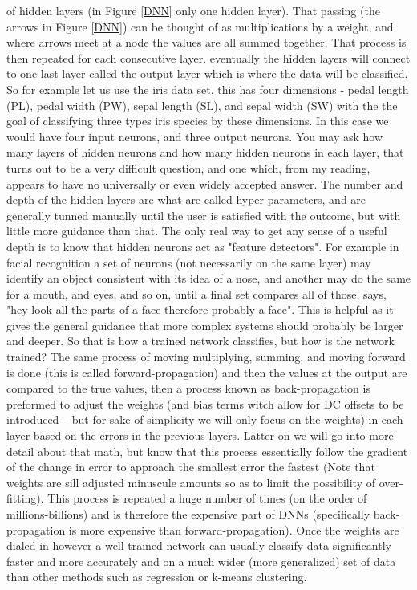 \documentclass[a4paper]{article}
\begin{document}
of hidden layers (in Figure \ref{DNN} only one hidden layer). That passing (the arrows in Figure \ref{DNN}) can be thought of as multiplications by a weight, and where arrows meet at a node the values are all summed together. That process is then repeated for each consecutive layer. eventually the hidden layers will connect to one last layer called the output layer which is where the data will be classified. So for example let us use the iris data set, this has four dimensions - pedal length (PL), pedal width (PW), sepal length (SL), and sepal width (SW) with the the goal of classifying three types iris species by these dimensions. In this case we would have four input neurons, and three output neurons. You may ask how many layers of hidden neurons and how many hidden neurons in each layer, that turns out to be a very difficult question, and one which, from my reading, appears to have no universally or even widely accepted answer. The number and depth of the hidden layers are what are called hyper-parameters, and are generally tunned manually until the user is satisfied with the outcome, but with little more guidance than that. The only real way to get any sense of a useful depth is to know that hidden neurons act as "feature detectors". For example in facial recognition a set of neurons (not necessarily on the same layer) may identify an object consistent with its idea of a nose, and another may do the same for a mouth, and eyes, and so on, until a final set compares all of those, says, "hey look all the parts of a face therefore probably a face". This is helpful as it gives the general guidance that more complex systems should probably be larger and deeper. So that is how a trained network classifies, but how is the network trained? The same process of moving multiplying, summing, and moving forward is done (this is called forward-propagation) and then the values at the output are compared to the true values, then a process known as back-propagation is preformed to adjust the weights (and bias terms witch allow for DC offsets to be introduced -- but for sake of simplicity we will only focus on the weights) in each layer based on the errors in the previous layers. Latter on we will go into more detail about that math, but know that this process essentially follow the gradient of the change in error to approach the smallest error the fastest (Note that weights are sill adjusted minuscule amounts so as to limit the possibility of over-fitting). This process is repeated a huge number of times (on the order of millions-billions) and is therefore the expensive part of DNNs (specifically back-propagation is more expensive than forward-propagation). Once the weights are dialed in however a well trained network can usually classify data significantly faster and more accurately and on a much wider (more generalized) set of data than other methods such as regression or k-means clustering.
\end{document}
